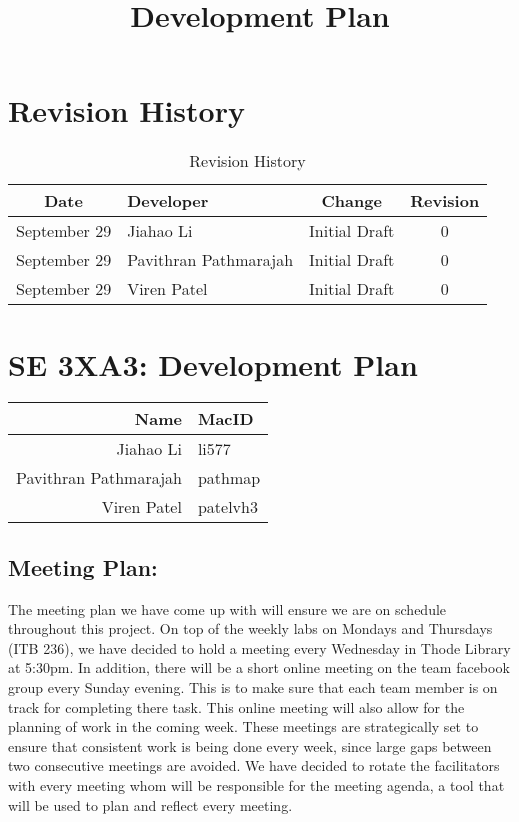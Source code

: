 \documentclass{article}
\begin{document}

\newpage
\title{Development Plan}
\hfill \break
\section*{Revision History}
\begin{table}[h!]
  \centering
  \caption{Revision History}
  \label{tab:table1}
  \begin{tabular}{clcc}
	\toprule
	Date &  Developer & Change & Revision\\
	\midrule
	September 29&Jiahao Li &Initial Draft &0\\
	September 29&Pavithran Pathmarajah &Initial Draft &0\\
	September 29&Viren Patel  &Initial Draft &0\\
	\bottomrule
  \end{tabular}
\end{table}



\newpage
{}

\section*{SE 3XA3: Development Plan}

\begin{table}[h!]

  \begin{tabular}{r l}
	\toprule
	Name &  MacID \\
	\midrule
	Jiahao Li & li577 \\
	Pavithran Pathmarajah & pathmap\\
	Viren Patel  & patelvh3\\
	\bottomrule
  \end{tabular}
\end{table}


\subsection*{Meeting Plan:}  
The meeting plan we have come up with will ensure
we are on schedule throughout this project. On top of the weekly labs on Mondays
and Thursdays (ITB 236), we have decided to hold a meeting every Wednesday in
Thode Library at 5:30pm. In addition, there will be a short online meeting on
the team facebook group every Sunday evening. This is to make sure that each
team member is on track for completing there task. This online meeting will also
allow for the planning of work in the coming week. These  meetings are
strategically set to ensure that consistent work is being done every week, since
large gaps between two consecutive meetings are avoided. We have decided to
rotate the facilitators with every meeting whom will be responsible for the
meeting agenda, a tool that will be used to plan and reflect every meeting.
\end{document}
